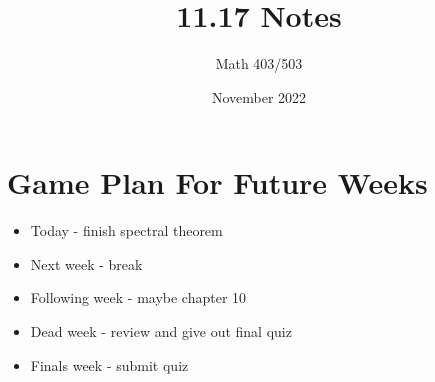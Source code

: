 \documentclass{article}
\title{11.17 Notes}
\author{Math 403/503}
\date{November 2022}
\begin{document}
\maketitle

\section{Game Plan For Future Weeks}
\begin{itemize}
    \item Today - finish spectral theorem 
    \item Next week - break 
    \item Following week - maybe chapter 10 
    \item Dead week - review and give out final quiz 
    \item Finals week - submit quiz 
\end{itemize}
\end{document}
